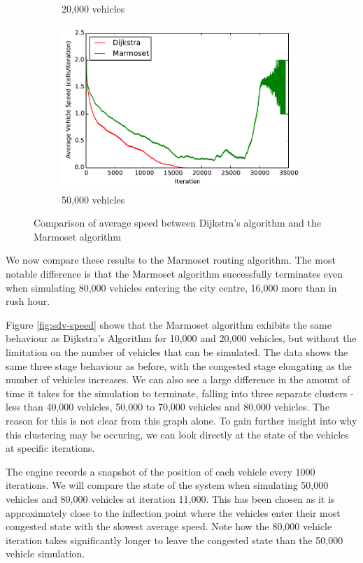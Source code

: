 \documentclass[ %
                    author={Alexander Hill},
                supervisor={Dr. Benjamin Sach},
                    degree={MEng},
                     title={MARMOSET},
                  subtitle={Multi-Agent Route Management using Online Simulation for Efficient Transportation},
                      type={research},
                      year={2016} ]{dissertation}
\begin{document}
\begin{figure}[p]
\begin{subfigure}[b]{0.3\textwidth}
        \caption{20,000 vehicles}
    \end{subfigure}
    \begin{subfigure}[b]{0.3\textwidth}
        \centering
        \includegraphics[width=\textwidth]{sdv-dij-comp-50k}
        \caption{50,000 vehicles}
    \end{subfigure}
    \caption{Comparison of average speed between Dijkstra's algorithm and the Marmoset algorithm}\label{fig:sdv-dij-comp}
\end{figure}

We now compare these results to the Marmoset routing algorithm. The most notable
difference is that the Marmoset algorithm successfully terminates even when
simulating 80,000 vehicles entering the city centre, 16,000 more than in rush
hour.

Figure \ref{fig:sdv-speed} shows that the Marmoset algorithm exhibits the same
behaviour as Dijkstra's Algorithm for 10,000 and 20,000 vehicles, but without
the limitation on the number of vehicles that can be simulated. The data shows
the same three stage behaviour as before, with the congested stage elongating as
the number of vehicles increases. We can also see a large difference in the
amount of time it takes for the simulation to terminate, falling into three
separate clusters - less than 40,000 vehicles, 50,000 to 70,000 vehicles and
80,000 vehicles. The reason for this is not clear from this graph alone. To gain
further insight into why this clustering may be occuring, we can look directly
at the state of the vehicles at specific iterations.

The engine records a snapshot of the position of each vehicle every 1000
iterations. We will compare the state of the system when simulating 50,000
vehicles and 80,000 vehicles at iteration 11,000. This has been chosen as it is
approximately close to the inflection point where the vehicles enter their most
congested state with the slowest average speed. Note how the 80,000 vehicle
iteration takes significantly longer to leave the congested state than the
50,000 vehicle simulation.
\end{document}
